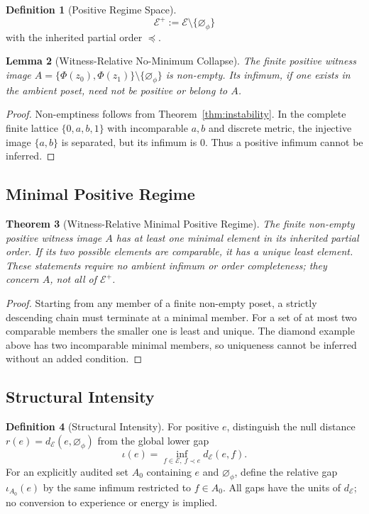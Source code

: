 \documentclass[11pt,a4paper]{article}
\theoremstyle{plain}
\newtheorem{theorem}{Theorem}[section]
\newtheorem{lemma}[theorem]{Lemma}
\theoremstyle{definition}
\newtheorem{definition}[theorem]{Definition}
\theoremstyle{remark}
\newcommand{\E}{\mathcal{E}}
\newcommand{\dE}{d_{\mathcal{E}}}
\newcommand{\nullphi}{\varnothing_\phi}
\newcommand{\Eplus}{\mathcal{E}^+}
\begin{document}
\begin{definition}[Positive Regime Space]
\[
\Eplus := \E \setminus \{\nullphi\}
\]
with the inherited partial order $\preceq$.
\end{definition}

\begin{lemma}[Witness-Relative No-Minimum Collapse]\label{lem:no-collapse}
The finite positive witness image $A=\{\Phi(z_0),\Phi(z_1)\}\setminus\{\nullphi\}$ is non-empty. Its infimum, if one exists in the ambient poset, need not be positive or belong to $A$.
\end{lemma}

\begin{proof}
Non-emptiness follows from Theorem~\ref{thm:instability}. In the complete finite lattice $\{0,a,b,1\}$ with incomparable $a,b$ and discrete metric, the injective image $\{a,b\}$ is separated, but its infimum is $0$. Thus a positive infimum cannot be inferred.
\end{proof}

\subsection{Minimal Positive Regime}

\begin{theorem}[Witness-Relative Minimal Positive Regime]\label{thm:minimal}
The finite non-empty positive witness image $A$ has at least one minimal element in its inherited partial order. If its two possible elements are comparable, it has a unique least element. These statements require no ambient infimum or order completeness; they concern $A$, not all of $\Eplus$.
\end{theorem}

\begin{proof}
Starting from any member of a finite non-empty poset, a strictly descending chain must terminate at a minimal member. For a set of at most two comparable members the smaller one is least and unique. The diamond example above has two incomparable minimal members, so uniqueness cannot be inferred without an added condition.
\end{proof}

\subsection{Structural Intensity}

\begin{definition}[Structural Intensity]
For positive $e$, distinguish the null distance $r(e)=\dE(e,\nullphi)$ from the global lower gap
\[
\iota(e)=\inf_{f\in\E,\ f\prec e}\dE(e,f).
\]
For an explicitly audited set $A_0$ containing $e$ and $\nullphi$, define the relative gap $\iota_{A_0}(e)$ by the same infimum restricted to $f\in A_0$. All gaps have the units of $\dE$; no conversion to experience or energy is implied.
\end{definition}
\end{document}

